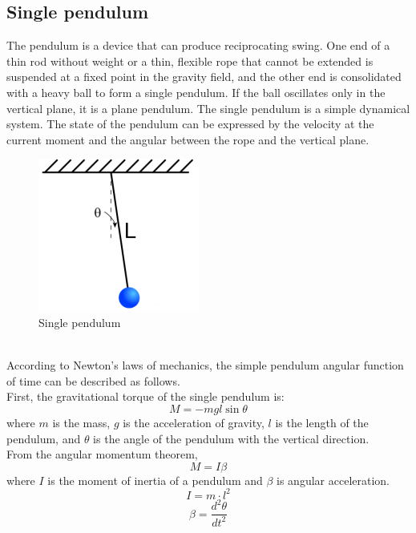 \documentclass[11pt,a4paper]{article}
\begin{document}
\subsection{Single pendulum}
The pendulum is a device that can produce reciprocating swing. One end of a thin rod without weight or a thin, flexible rope that cannot be extended is suspended at a fixed point in the gravity field, and the other end is consolidated with a heavy ball to form a single pendulum. If the ball oscillates only in the vertical plane, it is a plane pendulum. The single pendulum is a simple dynamical system. The state of the pendulum can be expressed by the velocity at the current moment and the angular between the rope and the vertical plane.
\\
\begin{figure}[ht!]
\centering
\includegraphics[scale=0.8]{4.png}
\caption{Single pendulum}
\label{fig:Single pendulum}
\end{figure}
\\
According to Newton's laws of mechanics, the simple pendulum angular function of time can be described as follows.
\\
\newline
First, the gravitational torque of the single pendulum is:
\begin{equation}
M=-m g l \sin \theta
\end{equation}
where $m$ is the mass, $g$ is the acceleration of gravity, $l$ is the length of the pendulum, and $\theta$ is the angle of the pendulum with the vertical direction.
\\
\newline
From the angular momentum theorem,
\begin{equation}
M=I \beta
\end{equation}
where $I$ is the moment of inertia of a pendulum and $\beta$ is angular acceleration.
\begin{equation}
I=m \cdot l^{2}
\end{equation}
\begin{equation}
\beta=\frac{d^{2} \theta}{d t^{2}}
\end{equation}
\end{document}
